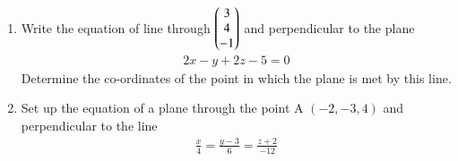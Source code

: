 \renewcommand{\theequation}{\theenumi}
\renewcommand{\thefigure}{\theenumi}
\begin{enumerate}[label=\thesubsection.\arabic*.,ref=\thesubsection.\theenumi]
%
\item Write the equation of line through $\begin{pmatrix}3 \\ 4 \\ -1\end{pmatrix}$ and perpendicular to the plane 
\begin{align}
    2x - y + 2z -5 = 0  \label{eq:solutions/4/48/5/given_plane_eq}
\end{align}
Determine the co-ordinates of the point in which the plane is met by this line.
\\
\solution

%
%
\item 
\begin{enumerate}
Set up the equation of a plane through the point A $\left(-2, -3, 4 \right)$ and perpendicular to the line 
\begin{align}
\frac{x}{4} = \frac{y - 3}{6} = \frac{z+2}{-12} \label{eq:solutions/4/48/6/b/eq1.1}
\end{align}
%
\solution


\end{enumerate}
\end{enumerate}


